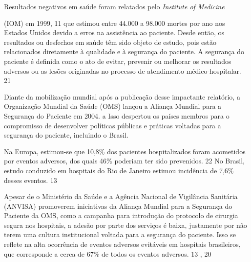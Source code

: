 \documentclass{article}
\begin{document}

Resultados negativos em saúde foram relatados pelo %
\textit{Institute of Medicine}

        (IOM) em 1999, %
11%
 que estimou entre 44.000 a 98.000 mortes por ano nos Estados Unidos devido a erros
        na assistência ao paciente. Desde então, os resultados ou desfechos em saúde têm sido objeto
        de estudo, pois estão relacionados diretamente à qualidade e à segurança do paciente. A
        segurança do paciente é definida como o ato de evitar, prevenir ou melhorar os resultados
        adversos ou as lesões originadas no processo de atendimento médico-hospitalar. %
21%


Diante da mobilização mundial após a publicação desse impactante relatório, a Organização
        Mundial da Saúde (OMS) lançou a Aliança Mundial para a Segurança do Paciente em 2004. %
a%
 Isso despertou os países membros para o compromisso de desenvolver políticas
        públicas e práticas voltadas para a segurança do paciente, incluindo o Brasil.

Na Europa, estimou-se que 10,8\% dos pacientes hospitalizados foram acometidos por eventos
        adversos, dos quais 46\% poderiam ter sido prevenidos. %
22%
 No Brasil, estudo conduzido em hospitais do Rio de Janeiro estimou incidência de
        7,6\% desses eventos. %
13%


Apesar de o Ministério da Saúde e a Agência Nacional de Vigilância Sanitária (ANVISA)
        promoverem iniciativas da Aliança Mundial para a Segurança do Paciente da OMS, como a
        campanha para introdução do protocolo de cirurgia segura nos hospitais, a adesão por parte
        dos serviços é baixa, justamente por não terem uma cultura institucional voltada para a
        segurança do paciente. Isso se reflete na alta ocorrência de eventos adversos evitáveis em
        hospitais brasileiros, que corresponde a cerca de 67\% de todos os eventos adversos. %
13%
,%
20%
\end{document}
